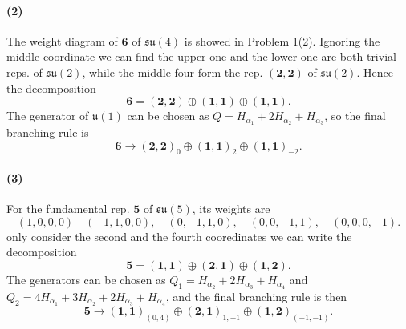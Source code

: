 \documentclass[12pt]{article}
\begin{document}
\paragraph{(2)}
The weight diagram of $\boldsymbol{6}$ of $\mathfrak{su}(4)$ is showed in Problem 1(2).
Ignoring the middle coordinate we can find the upper one and the lower one are both trivial reps. of $\mathfrak{su}(2)$, while the middle four form the rep. $(\boldsymbol{2}, \boldsymbol{2})$ of $\mathfrak{su}(2)$.
Hence the decomposition
\begin{equation*}
  \boldsymbol{6} = (\boldsymbol{2}, \boldsymbol{2}) \oplus (\boldsymbol{1}, \boldsymbol{1}) \oplus (\boldsymbol{1}, \boldsymbol{1}).
\end{equation*}
The generator of $\mathfrak{u}(1)$ can be chosen as $Q = H_{\alpha_1} + 2H_{\alpha_2} + H_{\alpha_3}$, so the final branching rule is
\begin{equation*}
  \boldsymbol{6} \rightarrow (\boldsymbol{2}, \boldsymbol{2})_{0} \oplus (\boldsymbol{1}, \boldsymbol{1})_{2} \oplus (\boldsymbol{1}, \boldsymbol{1})_{-2}.
\end{equation*}

\paragraph{(3)}
For the fundamental rep. $\boldsymbol{5}$ of $\mathfrak{su}(5)$, its weights are
\begin{equation*}
  (1, 0, 0, 0) \quad (-1, 1, 0, 0),\quad (0, -1, 1, 0),\quad (0, 0, -1, 1),\quad (0, 0, 0, -1).
\end{equation*}
only consider the second and the fourth cooredinates we can write the decomposition
\begin{equation*}
  \boldsymbol{5} = (\boldsymbol{1}, \boldsymbol{1}) \oplus (\boldsymbol{2}, \boldsymbol{1}) \oplus (\boldsymbol{1}, \boldsymbol{2}).
\end{equation*}
The generators can be chosen as $Q_1 = H_{\alpha_2} + 2H_{\alpha_3} + H_{\alpha_4}$ and $Q_2 = 4H_{\alpha_1} + 3H_{\alpha_2} + 2H_{\alpha_3} + H_{\alpha_4}$, and the final branching rule is then
\begin{equation*}
  \boldsymbol{5} \rightarrow (\boldsymbol{1}, \boldsymbol{1})_{(0, 4)} \oplus (\boldsymbol{2}, \boldsymbol{1})_{1, -1} \oplus (\boldsymbol{1}, \boldsymbol{2})_{(-1, -1)}.
\end{equation*}
\end{document}
